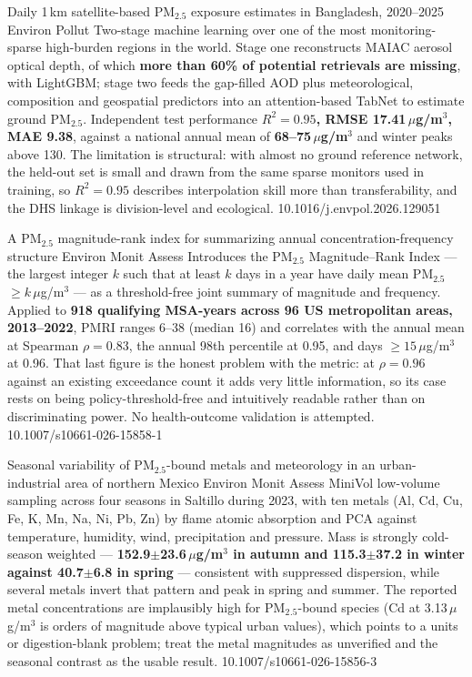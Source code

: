 \documentclass[10pt]{article}
\begin{document}
\clearpage


{Daily 1\,km satellite-based PM$_{2.5}$ exposure estimates in Bangladesh, 2020--2025}
{Environ Pollut}
{Two-stage machine learning over one of the most monitoring-sparse high-burden regions in
the world. Stage one reconstructs MAIAC aerosol optical depth, of which
\textbf{more than 60\% of potential retrievals are missing}, with LightGBM; stage two
feeds the gap-filled AOD plus meteorological, composition and geospatial predictors into
an attention-based TabNet to estimate ground PM$_{2.5}$. Independent test performance
\textbf{$R^2 = 0.95$, RMSE 17.41\,$\mu$g/m$^3$, MAE 9.38}, against a national annual mean
of \textbf{68--75\,$\mu$g/m$^3$} and winter peaks above 130. The limitation is structural:
with almost no ground reference network, the held-out set is small and drawn from the
same sparse monitors used in training, so $R^2 = 0.95$ describes interpolation skill more
than transferability, and the DHS linkage is division-level and ecological.}
{10.1016/j.envpol.2026.129051}

{A PM$_{2.5}$ magnitude-rank index for summarizing annual concentration-frequency
structure}
{Environ Monit Assess}
{Introduces the PM$_{2.5}$ Magnitude--Rank Index --- the largest integer $k$ such that at
least $k$ days in a year have daily mean PM$_{2.5}$ $\geq k$\,$\mu$g/m$^3$ --- as a
threshold-free joint summary of magnitude and frequency. Applied to \textbf{918
qualifying MSA-years across 96 US metropolitan areas, 2013--2022}, PMRI ranges 6--38
(median 16) and correlates with the annual mean at Spearman $\rho = 0.83$, the annual
98th percentile at 0.95, and days $\geq15$\,$\mu$g/m$^3$ at 0.96. That last figure is the
honest problem with the metric: at $\rho = 0.96$ against an existing exceedance count it
adds very little information, so its case rests on being policy-threshold-free and
intuitively readable rather than on discriminating power. No health-outcome validation is
attempted.}
{10.1007/s10661-026-15858-1}

{Seasonal variability of PM$_{2.5}$-bound metals and meteorology in an urban-industrial
area of northern Mexico}
{Environ Monit Assess}
{MiniVol low-volume sampling across four seasons in Saltillo during 2023, with ten metals
(Al, Cd, Cu, Fe, K, Mn, Na, Ni, Pb, Zn) by flame atomic absorption and PCA against
temperature, humidity, wind, precipitation and pressure. Mass is strongly cold-season
weighted --- \textbf{152.9$\pm$23.6\,$\mu$g/m$^3$ in autumn and 115.3$\pm$37.2 in winter
against 40.7$\pm$6.8 in spring} --- consistent with suppressed dispersion, while several
metals invert that pattern and peak in spring and summer. The reported metal
concentrations are implausibly high for PM$_{2}$$_{.5}$-bound species (Cd at
3.13\,$\mu$g/m$^3$ is orders of magnitude above typical urban values), which points to a
units or digestion-blank problem; treat the metal magnitudes as unverified and the
seasonal contrast as the usable result.}
{10.1007/s10661-026-15856-3}
\end{document}
